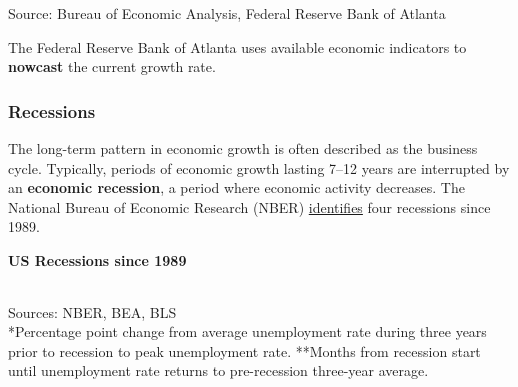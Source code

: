 \documentclass{report}
\newcommand{\tbllink}[1]{\href{https://raw.githubusercontent.com/bdecon/US-chartbook/master/chartbook/data/#1}{\faTable}}
\begin{document}
\begin{minipage}{0.76\textwidth}
\footnotesize{Source: Bureau of Economic Analysis, Federal Reserve Bank of Atlanta} \hfill \tbllink{gdp.csv}
\vspace{1mm}

\small  

The Federal Reserve Bank of Atlanta uses available economic indicators to \textbf{nowcast} the current growth rate. 
\end{minipage}
\newpage
\begin{minipage}{0.76\textwidth}
\subsubsection*{Recessions}
\vspace{-1mm}

\small The long-term pattern in economic growth is often described as the business cycle. Typically, periods of economic growth lasting 7--12 years are interrupted by an \textbf{economic recession}, a period where economic activity decreases. The National Bureau of Economic Research (NBER) \href{https://www.nber.org/research/business-cycle-dating}{identifies} four recessions since 1989.


\vspace{0.5mm}

\normalsize \textbf{US Recessions since 1989}
\vspace{-4mm}

\footnotesize {} \setlength{\tabcolsep}{1.0pt} \color{black!90}
	{\renewcommand{\arraystretch}{1.62}
\hspace*{-2mm} \begin{tabular}{p{29mm} C{16mm} C{16mm} C{13.2mm} C{13.2mm} C{13.2mm} C{13.2mm}}
		 \hline
	\end{tabular}}
	\vspace{-1mm}
	
\footnotesize{Sources: NBER, BEA, BLS}\\
\footnotesize{*Percentage point change from average unemployment rate during three years prior to recession to peak unemployment rate. **Months from recession start until unemployment rate returns to pre-recession three-year average.}
\vspace{5mm}


\end{minipage}
\end{document}
